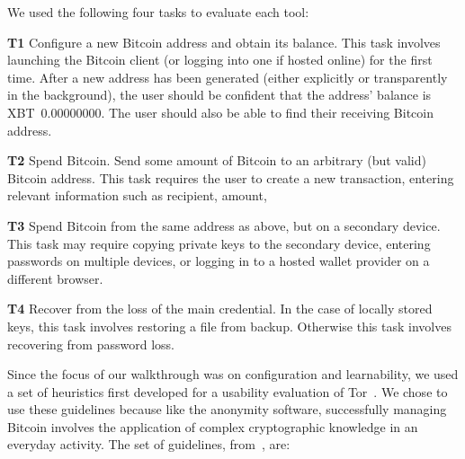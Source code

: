 We used the following four tasks to evaluate each tool:

\begin{compactlist}
	\item[\bf T1] Configure a new Bitcoin address and obtain its balance. This task involves launching the Bitcoin client (or logging into one if hosted online) for the first time. After a new address has been generated (either explicitly or transparently in the background), the user should be confident that the address' balance is XBT~0.00000000. The user should also be able to find their receiving Bitcoin address.\label{sec:ct-1}
	\item[\bf T2] Spend Bitcoin. Send some amount of Bitcoin to an arbitrary (but valid) Bitcoin address. This task requires the user to create a new transaction, entering relevant information such as recipient, amount, \etc\label{sec:ct-2}
	\item[\bf T3] Spend Bitcoin from the same address as above, but on a secondary device. This task may require copying private keys to the secondary device, entering passwords on multiple devices, or logging in to a hosted wallet provider on a different browser.\label{sec:ct-3}
	\item[\bf T4] Recover from the loss of the main credential. In the case of locally stored keys, this task involves restoring a file from backup. Otherwise this task involves recovering from password loss.\label{sec:ct-4}
\end{compactlist}

Since the focus of our walkthrough was on configuration and learnability, we used a set of heuristics first developed for a usability evaluation of Tor~\cite{COA07}. We chose to use these guidelines because like the anonymity software, successfully managing Bitcoin involves the application of complex cryptographic knowledge in an everyday activity. The set of guidelines, from~\cite{COA07}, are: 



